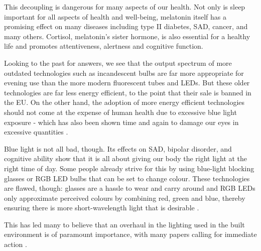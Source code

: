 This decoupling is dangerous for many aspects of our health. Not only is sleep important for all aspects of health and well-being, melatonin itself has a promising effect on many diseases including type II diabetes, SAD, cancer, and many others. Cortisol, melatonin's sister hormone, is also essential for a healthy life and promotes attentiveness, alertness and cognitive function.

Looking to the past for answers, we see that the output spectrum of more outdated technologies such as incandescent bulbs are far more appropriate for evening use than the more modern fluorescent tubes and LEDs. But these older technologies are far less energy efficient, to the point that their sale is banned in the EU. On the other hand, the adoption of more energy efficient technologies should not come at the expense of human health \citep{boyceReviewImpactLight2010} due to excessive blue light exposure - which has also been shown time and again to damage our eyes in excessive quantities \citep{uedaEyeDamageControl2009, kuseDamagePhotoreceptorderivedCells2014, niwanoBlueLightInjures2014, marekBlueLightPhototoxicity2018, nakamuraExposureExcessiveBlue2018}.

Blue light is not all bad, though. Its effects on SAD, bipolar disorder, and cognitive ability show that it is all about giving our body the right light at the right time of day. Some people already strive for this by using blue-light blocking glasses or RGB LED bulbs that can be set to change colour. These technologies are flawed, though: glasses are a hassle to wear and carry around and RGB LEDs only approximate perceived colours by combining red, green and blue, thereby ensuring there is more short-wavelength light that is desirable \citep{gilewskiEcologicalHarmfulnessRGB2018}.

This has led many to believe that an overhaul in the lighting used in the built environment is of paramount importance, with many papers calling for immediate action \citep{webbConsiderationsLightingBuilt2006, boyceReviewImpactLight2010, groseArtificialLightNight2014}.






